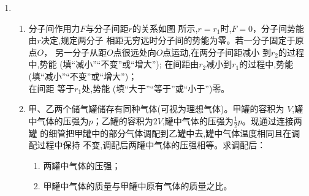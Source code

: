 \begin{enumerate}
\begin{enumerate}
\end{enumerate}
\begin{figure}[h!]
\flushright

\end{figure}








\newpage
{}



\item 
\begin{enumerate}
\item
分子间作用力$ F $与分子间距$ r $的关系如图
所示,$ r=r_{1} $时,$ F=0 $，分子间势能由$ r $决定,规定两分子
相距无穷远时分子间的势能为零。若一分子固定于原点$ O $，
另一分子从距$ O $点很远处向$ O $点运动,在两分子间距减小
到$ r_{2} $的过程中,势能 \underlinegap (填“减小”“不变”或“增大”);
在间距由$ r_{2} $减小到$ r_{1} $的过程中,势能 \hfullline (填“减小”“不变”或“增大”)；\\
在间距
等于$ r_{1} $处,势能 \underlinegap (填“大于”“等于”或“小于”)零。

\begin{figure}[h!]
\centering

\end{figure}




\item 
甲、乙两个储气罐储存有同种气体(可视为理想气体)。甲罐的容积为
$ V $,罐中气体的压强为$ p$；乙罐的容积为$ 2 V $,罐中气体的压强为$ \frac{ 1 }{ 2 } p $。现通过连接两罐
的细管把甲罐中的部分气体调配到乙罐中去,罐中气体温度相同且在调配过程中保持
不变,调配后两罐中气体的压强相等。求调配后：
\begin{enumerate}
\item
两罐中气体的压强；
\item 
甲罐中气体的质量与甲罐中原有气体的质量之比。
\end{enumerate}





\end{enumerate}
\end{enumerate}
